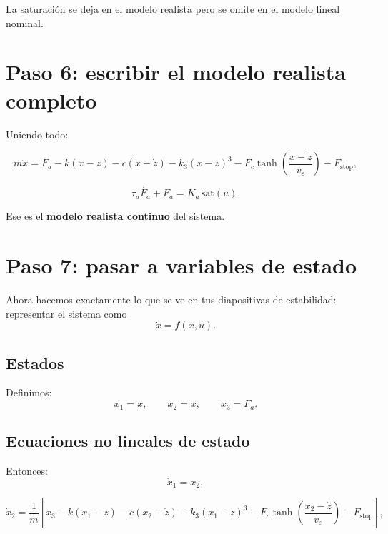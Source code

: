 \documentclass[11pt]{article}
\begin{document}
La saturaci\'on se deja en el modelo realista pero se omite en el modelo lineal nominal.

\section{Paso 6: escribir el modelo realista completo}

Uniendo todo:

\begin{equation}
m\ddot{x} = F_a - k(x-z) - c(\dot{x}-\dot{z}) - k_3(x-z)^3
- F_c\tanh\left(\frac{\dot{x}-\dot{z}}{v_\varepsilon}\right)
- F_{\text{stop}},
\label{eq:real_full}
\end{equation}

\begin{equation}
\tau_a\dot{F_a} + F_a = K_a\,\mathrm{sat}(u).
\label{eq:real_act}
\end{equation}

Ese es el \textbf{modelo realista continuo} del sistema.

\section{Paso 7: pasar a variables de estado}

Ahora hacemos exactamente lo que se ve en tus diapositivas de estabilidad: representar el sistema como
\[
\dot{x}=f(x,u).
\]

\subsection{Estados}

Definimos:
\begin{equation}
x_1 = x,
\qquad
x_2 = \dot{x},
\qquad
x_3 = F_a.
\end{equation}

\subsection{Ecuaciones no lineales de estado}

Entonces:
\begin{equation}
\dot{x}_1 = x_2,
\label{eq:state1}
\end{equation}

\begin{equation}
\dot{x}_2 =
\frac{1}{m}
\left[
x_3
- k(x_1-z)
- c(x_2-\dot{z})
- k_3(x_1-z)^3
- F_c\tanh\left(\frac{x_2-\dot{z}}{v_\varepsilon}\right)
- F_{\text{stop}}
\right],
\label{eq:state2}
\end{equation}
\end{document}
